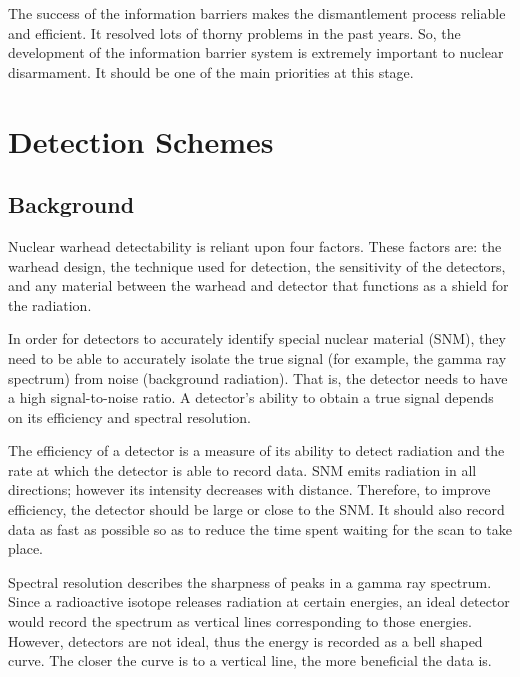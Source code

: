 \documentclass[twoside,titlepage,11pt,twocolumn,a4paper]{article}
\begin{document}
The success of the information barriers makes the dismantlement
process reliable and efficient. It resolved lots of thorny problems in
the past years. So, the development of the information barrier system
is extremely important to nuclear disarmament. It should be one of the
main priorities at this stage.

\section{Detection Schemes}
\subsection{Background}
Nuclear warhead detectability is reliant upon four factors. These
factors are: the warhead design, the technique used for detection, the
sensitivity of the detectors, and any material between the warhead and
detector that functions as a shield for the
radiation. \citep{hippel1990}

In order for detectors to accurately identify special nuclear material
(SNM), they need to be able to accurately isolate the true signal (for
example, the gamma ray spectrum) from noise (background
radiation). That is, the detector needs to have a high signal-to-noise
ratio. A detector's ability to obtain a true signal depends on its
efficiency and spectral resolution. \citep{medalia2007}

The efficiency of a detector is a measure of its ability to detect
radiation and the rate at which the detector is able to record
data. \citep{medalia2007,bushberg1994} SNM emits radiation in all
directions; however its intensity decreases with distance. Therefore,
to improve efficiency, the detector should be large or close to the
SNM. It should also record data as fast as possible so as to reduce
the time spent waiting for the scan to take place. \citep{medalia2007}

Spectral resolution describes the sharpness of peaks in a gamma ray
spectrum. Since a radioactive isotope releases radiation at certain
energies, an ideal detector would record the spectrum as vertical
lines corresponding to those energies. However, detectors are not
ideal, thus the energy is recorded as a bell shaped curve. The closer
the curve is to a vertical line, the more beneficial the data
is. \citep{medalia2007}
\end{document}
